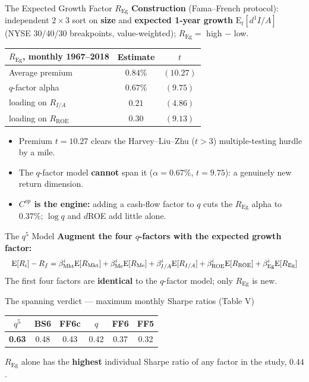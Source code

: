 \documentclass{beamer}
\begin{document}
\begin{frame}{The Expected Growth Factor \texorpdfstring{$R_{\text{Eg}}$}{REg}}
	\textbf{Construction} (Fama--French protocol): independent $2\times3$ sort on \textbf{size} and \textbf{expected 1-year growth} $\mathrm{E}_t[d^{1}I/A]$ (NYSE 30/40/30 breakpoints, value-weighted); $R_{\text{Eg}}=$ high $-$ low.
	\begin{center}
		\small
		\begin{tabular}{@{}lcc@{}}
			\toprule
			$R_{\text{Eg}}$, monthly 1967--2018 & Estimate & $t$ \\
			\midrule
			Average premium                     & $0.84\%$ & $(10.27)$ \\
			$q$-factor alpha                    & $0.67\%$ & $(9.75)$ \\
			\quad loading on $R_{I/A}$          & $0.21$   & $(4.86)$ \\
			\quad loading on $R_{\text{ROE}}$   & $0.30$   & $(9.13)$ \\
			\bottomrule
		\end{tabular}
	\end{center}
	\begin{itemize}
		\item Premium $t=10.27$ clears the Harvey--Liu--Zhu ($t>3$) multiple-testing hurdle by a mile.
		\item The $q$-factor model \textbf{cannot} span it ($\alpha=0.67\%$, $t=9.75$): a genuinely new return dimension.
		\item \textbf{$C^{op}$ is the engine:} adding a cash-flow factor to $q$ cuts the $R_{\text{Eg}}$ alpha to $0.37\%$; $\log q$ and $d$ROE add little alone.
	\end{itemize}
\end{frame}

\begin{frame}{The \texorpdfstring{$q^5$}{q5} Model}
	\textbf{Augment the four $q$-factors with the expected growth factor:}
	\begin{equation}\label{equ:q5model}
		\resizebox{\linewidth}{!}{$\displaystyle
		\mathrm{E}[R_i]-R_f=\beta^i_{\text{Mkt}}\mathrm{E}[R_{\text{Mkt}}]+\beta^i_{\text{Me}}\mathrm{E}[R_{\text{Me}}]+\beta^i_{I/A}\mathrm{E}[R_{I/A}]+\beta^i_{\text{ROE}}\mathrm{E}[R_{\text{ROE}}]+\beta^i_{\text{Eg}}\mathrm{E}[R_{\text{Eg}}]
		$}
	\end{equation}
	The first four factors are \textbf{identical} to the $q$-factor model; only $R_{\text{Eg}}$ is new.
	\begin{block}{The spanning verdict --- maximum monthly Sharpe ratios (Table V)}
		\begin{center}
			\small
			\begin{tabular}{@{}cccccc@{}}
				\toprule
				$q^5$ & BS6 & FF6c & $q$ & FF6 & FF5 \\
				\midrule
				\textbf{0.63} & 0.48 & 0.43 & 0.42 & 0.37 & 0.32 \\
				\bottomrule
			\end{tabular}
		\end{center}
		$R_{\text{Eg}}$ alone has the \textbf{highest} individual Sharpe ratio of any factor in the study, $0.44$.
	\end{block}
\end{frame}
\end{document}
